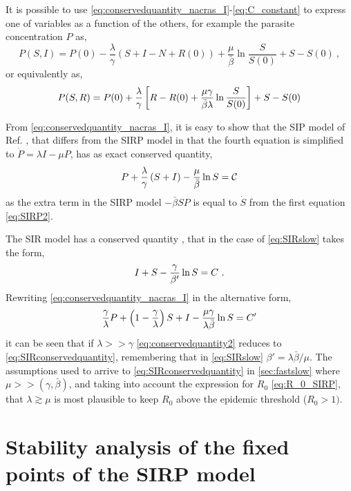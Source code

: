 It is possible to use \cref{eq:conservedquantity_nacras_I}-\cref{eq:C_constant}
to
express one of variables as a function of the others, for example
the parasite concentration $P$ as,
\begin{equation} \label{eq:PSI_exact}
    P(S, I)=P(0)-\frac{\lambda}{\gamma}\left(S+I-N+R(0)\right)+
    \frac{\mu}{\bar{\beta}}\ln{\frac{S}{S(0)}} + S - S(0)\ ,
\end{equation}
or equivalently as,
\begin{equation}\label{eq:psrexact}
    P(S,R)=P(0) + \frac{\lambda}{\gamma}\left[R-R(0)+
        \frac{\mu\gamma}{\bar{\beta}\lambda}\ln{\frac{S}{S(0)}}\right] + S - S(0)
\end{equation}

From \cref{eq:conservedquantity_nacras_I}, it is easy to show that the SIP
model
of Ref. \cite{article_SIP}, that differs from the SIRP model in that the
fourth equation is simplified to $\dot{P}=\lambda I-\mu P$, has as
exact conserved quantity,
\begin{equation}
    P + \frac{\lambda}{\gamma}\left(S+I\right)-\frac{\mu}{\bar{\beta}}\ln
    S={\mathcal C}
    \label{eq:conservedquantitySIP}
\end{equation}
as the extra term in the SIRP model $-\bar{\beta}SP$ is equal to $\dot{S}$
from the first equation \cref{eq:SIRP2}.

The SIR model has a conserved quantity \cite{Murray_book}, that in the case
of
\cref{eq:SIRslow} takes the form,
\begin{equation}
    I+S-{{\gamma}\over{\beta'}} \ln S =C\ .
    \label{eq:SIRconservedquantity}
\end{equation}
Rewriting \cref{eq:conservedquantity_nacras_I} in the alternative form,
\begin{equation}
    {{\gamma}\over{\lambda}} P +\left(1-{{\gamma}\over{\lambda}}\right) S + I
    -{{\mu\gamma}\over{\lambda\bar{\beta}}} \ln S=C'
    \label{eq:conservedquantity2}
\end{equation}
it can be seen that if $\lambda>>\gamma$ \cref{eq:conservedquantity2} reduces
to
\cref{eq:SIRconservedquantity}, remembering that in \cref{eq:SIRslow}
$\beta'=\lambda\bar{\beta}/\mu$. The assumptions used to arrive to
\cref{eq:SIRconservedquantity} in \cref{sec:fastslow} where
$\mu>>(\gamma,\bar{\beta})$, and taking into account the expression for $R_0$
\cref{eq:R_0_SIRP}, that $\lambda\gtrsim\mu$ is most plausible to keep $R_0$
above the epidemic threshold ($R_0>1)$.

\section{Stability analysis of the fixed points of the SIRP model}
\label{app:linstabfp}

